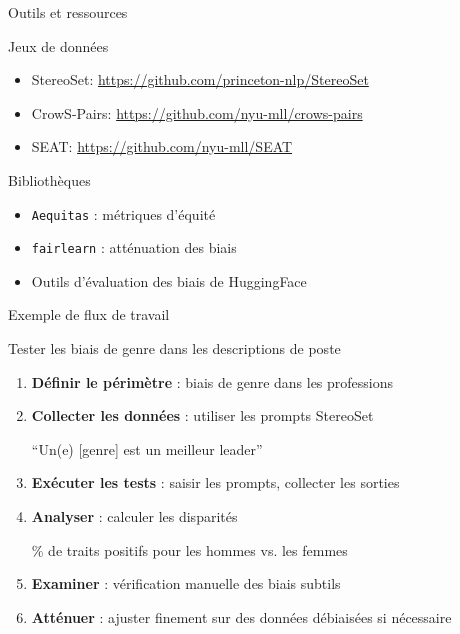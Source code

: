 \begin{frame}{Outils et ressources}

    \begin{block}{Jeux de données}
        \medskip
        \begin{itemize}
            \item StereoSet: \url{https://github.com/princeton-nlp/StereoSet}
            \item CrowS-Pairs: \url{https://github.com/nyu-mll/crows-pairs}
            \item SEAT: \url{https://github.com/nyu-mll/SEAT}
        \end{itemize}
    \end{block}

    \bigskip

    \begin{block}{Bibliothèques}
        \medskip
        \begin{itemize}
            \item \texttt{Aequitas} : métriques d'équité
            \item \texttt{fairlearn} : atténuation des biais
            \item Outils d'évaluation des biais de HuggingFace
        \end{itemize}
    \end{block}

\end{frame}


\begin{frame}{Exemple de flux de travail}

    \begin{block}{Tester les biais de genre dans les descriptions de poste}
        \medskip
        \begin{enumerate}
            \item<+-> \textbf{Définir le périmètre} : biais de genre dans les professions

            \item<+-> \textbf{Collecter les données} : utiliser les prompts StereoSet

            ``Un(e) [genre] est un meilleur leader''

            \item<+-> \textbf{Exécuter les tests} : saisir les prompts, collecter les sorties

            \item<+-> \textbf{Analyser} : calculer les disparités

            \% de traits positifs pour les hommes vs. les femmes

            \item<+-> \textbf{Examiner} : vérification manuelle des biais subtils

            \item<+-> \textbf{Atténuer} : ajuster finement sur des données débiaisées si nécessaire
        \end{enumerate}
    \end{block}

\end{frame}


